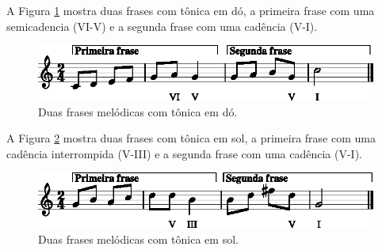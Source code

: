 \begin{example}
A Figura \ref{fig:abc-frasemelodica1} mostra duas frases com tônica em dó, 
a primeira frase com uma semicadencia (VI-V) e a segunda frase com uma cadência (V-I).
\end{example}

\begin{figure}[H]
\centering
    \includegraphics[width=\textwidth]{chapters/cap-musica-composer/frasemelodica1-1.eps}
\caption{Duas frases melódicas com tônica em dó.}
\label{fig:abc-frasemelodica1}
\end{figure}

\begin{example}
A Figura \ref{fig:abc-frasemelodica2} mostra duas frases  com tônica em sol, 
a primeira frase com uma cadência interrompida (V-III) e a segunda frase com uma cadência (V-I).
\end{example}

\begin{figure}[H]
\centering
    \includegraphics[width=\textwidth]{chapters/cap-musica-composer/frasemelodica2-1.eps}
\caption{Duas frases melódicas com tônica em sol.}
\label{fig:abc-frasemelodica2}
\end{figure}



